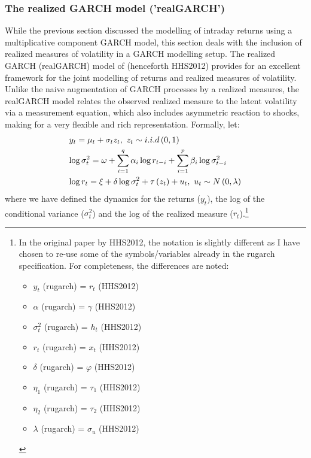 \subsubsection{The realized GARCH model ('realGARCH')}\label{section:realgarch}
While the previous section discussed the modelling of intraday returns using a multiplicative component GARCH model, this section deals with the inclusion of realized measures of volatility
in a GARCH modelling setup. The realized GARCH (realGARCH) model of \cite{Hansen2012} (henceforth HHS2012) provides for an excellent framework for the joint modelling of returns and realized measures of volatility. Unlike the naive augmentation of GARCH processes by a realized measures, the realGARCH model relates the observed realized measure to the latent volatility via a measurement equation, which also includes asymmetric reaction to shocks, making for a very flexible and rich representation. Formally, let:
\begin{equation}
\begin{gathered}
  {y_t} = {\mu _t} + {\sigma _t}{z_t},{\text{  }}{z_t} \sim i.i.d\left( {0,1} \right) \hfill \\
  \log \sigma _t^2 = \omega  + \sum\limits_{i = 1}^q {{\alpha _i}\log {r_{t - i}} + \sum\limits_{i = 1}^p {{\beta _i}\log \sigma _{t - i}^2} }  \hfill \\
  \log r_t = \xi  + \delta \log \sigma _t^2 + \tau \left( {{z_t}} \right) + {u_t},{\text{  }}{u_t} \sim N\left( {0,\lambda } \right) \hfill \\
\end{gathered}
\end{equation}
where we have defined the dynamics for the returns ($y_t$), the log of the conditional variance ($\sigma^2_t$) and the log of the realized measure ($r_t$).\footnote{In the original paper by HHS2012, the notation is slightly different as I have chosen to re-use some of the symbols/variables already in the rugarch specification. For completeness, the differences are noted:
\begin{itemize}
\item $y_t$ (rugarch)  = $r_t$ (HHS2012)
\item $\alpha$ (rugarch)  = $\gamma$ (HHS2012)
\item $\sigma^2_t$ (rugarch) = $h_t$ (HHS2012)
\item $r_t$ (rugarch)  = $x_t$ (HHS2012)
\item $\delta$ (rugarch)   = $\varphi$ (HHS2012)
\item $\eta_1$ (rugarch) = $\tau_1$ (HHS2012)
\item $\eta_2$ (rugarch) = $\tau_2$ (HHS2012)
\item $\lambda$ (rugarch)  = $\sigma_u$ (HHS2012)
\end{itemize}
}
